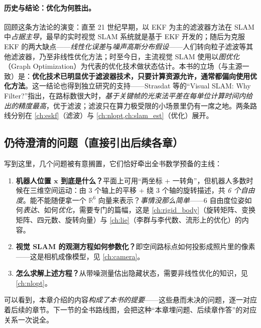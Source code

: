 \paragraph{历史与结论：优化为何胜出。}
回顾这条方法论的演变\cite{gaoxiang2019slam14}：直至 21 世纪早期，以 EKF 为主的滤波器方法在 SLAM 中\emph{占据主导}，最早的实时视觉 SLAM 系统就是基于 EKF 开发的；随后为克服 EKF 的两大缺点——\emph{线性化误差}与\emph{噪声高斯分布假设}——人们转向粒子滤波等其他滤波器，乃至非线性优化方法；时至今日，主流视觉 SLAM 使用以\emph{图优化}（Graph Optimization）为代表的优化技术做状态估计。本书的立场（与主源一致）是：\textbf{优化技术已明显优于滤波器技术，只要计算资源允许，通常都偏向使用优化方法}\cite{gaoxiang2019slam14}。这一结论也得到独立研究的支持——Strasdat 等的“Visual SLAM: Why Filter?”指出，在路标数很大时，\emph{基于关键帧的光束法平差在每单位计算时间内给出的精度最高}，优于滤波；滤波只在算力极受限的小场景里仍有一席之地。两条路线分别在 \cref{ch:eskf}（滤波）与 \cref{ch:nlopt,ch:slam_est}（优化）展开。

\subsection{仍待澄清的问题（直接引出后续各章）}
\label{sec:intro-pending}
写到这里，几个问题被有意搁置，它们恰好牵出全书数学预备的主线\cite{gaoxiang2019slam14}：

\begin{enumerate}
  \item \textbf{机器人位置 $\mathbf{x}$ 到底是什么？}平面上可用“两坐标 + 一转角”，但机器人多数时候在三维空间运动：由 3 个轴上的平移 + 绕 3 个轴的旋转描述，共 \emph{6 个自由度}。能不能随便拿一个 $\mathbb{R}^6$ 向量来表示？\emph{事情没那么简单}——6 自由度位姿如何\emph{表达}、如何\emph{优化}，需要专门的篇幅，这是 \cref{ch:rigid_body}（旋转矩阵、变换矩阵、四元数、旋转向量）与 \cref{ch:lie}（李群与李代数、流形上的优化）的内容。
  \item \textbf{视觉 SLAM 的观测方程如何参数化？}即空间路标点如何投影成照片里的像素——这是相机成像模型，见 \cref{ch:camera}。
  \item \textbf{怎么求解上述方程？}从带噪测量估出隐藏状态，需要非线性优化的知识，见 \cref{ch:nlopt}。
\end{enumerate}

\noindent 可以看到，本章介绍的内容\emph{构成了本书的提要}——这些悬而未决的问题，逐一对应着后续的章节。下一节的全书路线图，会把这种“本章埋问题、后续章作答”的对应关系一次说全。

